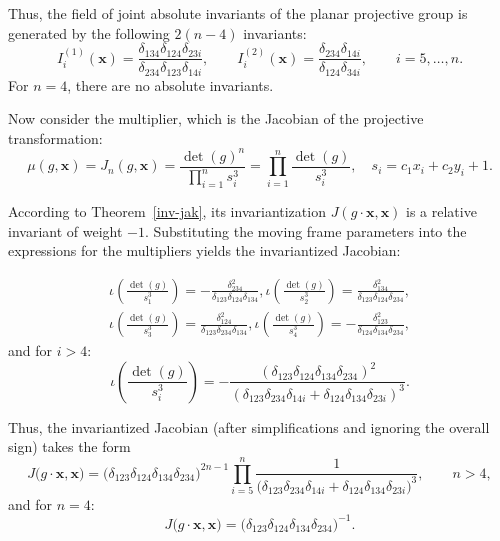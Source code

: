 \documentclass[12pt,reqno]{amsart}
\newcommand{\bs}{\boldsymbol}
\begin{document}
Thus, the field of joint absolute invariants of the planar projective group is generated by the following \(2(n-4)\) invariants:
$$
I^{(1)}_i(\boldsymbol{x}) = \frac{\delta_{134} \delta_{124} \delta_{23i}}{\delta_{234} \delta_{123} \delta_{14i}}, \qquad
I^{(2)}_i(\boldsymbol{x}) = \frac{\delta_{234} \delta_{14i}}{\delta_{124} \delta_{34i}}, \qquad i = 5, \ldots, n.
$$
For \(n = 4\), there are no absolute invariants.

Now consider the multiplier, which is the Jacobian of the projective transformation:
$$
\mu(g, \boldsymbol{x}) = J_n(g, \boldsymbol{x}) = \frac{\det(g)^n}{\prod_{i=1}^n s_i^3} = \prod_{i=1}^n \frac{\det(g)}{s_i^3}, \quad s_i = c_1 x_i + c_2 y_i + 1.
$$

According to Theorem~\ref{inv-jak}, its invariantization \(J(g \cdot \boldsymbol{x}, \boldsymbol{x})\) is a relative invariant of weight \(-1\). Substituting the moving frame parameters into the expressions for the multipliers yields the invariantized Jacobian:

\begin{gather*}
\iota\left(\frac{\det(g)}{s_1^3} \right)=-\frac{\delta_{234}^2}{\delta_{123} \delta_{124} \delta_{134}}, \iota\left(\frac{\det(g)}{s_2^3} \right)=\frac{\delta_{134}^2}{\delta_{123} \delta_{124} \delta_{234}}, \\
\iota\left(\frac{\det(g)}{s_3^3} \right)=\frac{\delta_{124}^2}{\delta_{123} \delta_{234} \delta_{134}}, \iota\left(\frac{\det(g)}{s_4^3} \right)=-\frac{\delta_{123}^2}{\delta_{124} \delta_{134} \delta_{234}},
\end{gather*}
and for  $i>4$:
$$
\iota\left(\frac{\det(g)}{s_i^3} \right)=-\frac{(\delta_{123} \delta_{124} \delta_{134} \delta_{234})^{2}}{(\delta_{123}  \delta_{234} \delta_{14i}+\delta_{124} \delta_{134}  \delta_{23i})^3}.
$$



Thus, the invariantized Jacobian (after  simplifications and ignoring the overall sign) takes the form
\begin{equation}\label{n>4}
J\bigl(g\!\cdot\!\bs x,\bs x\bigr)
=
\bigl(\delta_{123}\delta_{124}\delta_{134}\delta_{234}\bigr)^{2n-1}
\prod_{i=5}^{n}
\frac{1}{\bigl(\delta_{123}\delta_{234}\delta_{14i}+\delta_{124}\delta_{134}\delta_{23i}\bigr)^3},
\qquad n>4,
\end{equation}
and for  $n=4$:
\begin{equation*}\label{n=4}
J\bigl(g\!\cdot\!\bs x,\bs x\bigr)
=
\bigl(\delta_{123}\delta_{124}\delta_{134}\delta_{234}\bigr)^{-1}.
\end{equation*}
\end{document}
